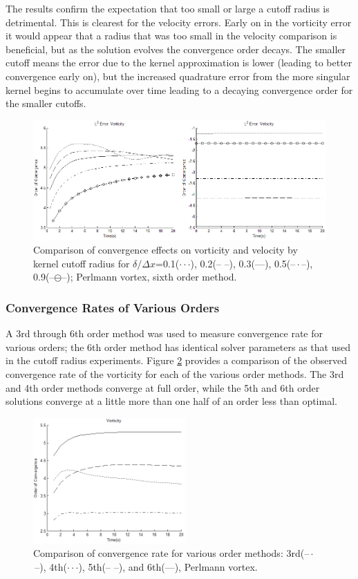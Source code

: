 \documentclass[]{aiaa-tc}%
\begin{document}
The results confirm the expectation that too small or large a cutoff radius is detrimental. This is clearest for the velocity errors. Early on in the vorticity error it would appear that a radius that was too small in the velocity comparison is beneficial, but as the solution evolves the convergence order decays. The smaller cutoff means the error due to the kernel approximation is lower (leading to better convergence early on), but the increased quadrature error from the more singular kernel begins to accumulate over time leading to a decaying convergence order for the smaller cutoffs.
\begin{figure}
\centering
\includegraphics[width=1\textwidth]{CutoffWU.PNG}
\caption{\label{fig:CutoffWU}Comparison of convergence effects on vorticity and velocity by kernel cutoff radius for $\delta/\Delta x$=0.1($\cdot \cdot \cdot$), 0.2(--{ }--), 0.3(---), 0.5(--\,$\cdot$\,--), 0.9(--\!$\ominus$\!--);  Perlmann vortex, sixth order method.}
\end{figure}

\subsubsection{Convergence Rates of Various Orders}
A 3rd through 6th order method was used to measure convergence rate for various orders; the 6th order method has identical solver parameters as that used in the cutoff radius experiments. Figure \ref{fig:Porder} provides a comparison of the observed convergence rate of the vorticity for each of the various order methods. The 3rd and 4th order methods converge at full order, while the 5th and 6th order solutions converge at a little more than one half of an order less than optimal.

\begin{figure}
\centering
\includegraphics[width=0.52\textwidth]{PorderR.PNG}
\caption{\label{fig:Porder}Comparison of convergence rate for various order methods: 3rd(--\,$\cdot$\,--), 4th($\cdot \cdot \cdot$), 5th(--{ }--), and 6th(---), Perlmann vortex.}
\end{figure}
\end{document}

